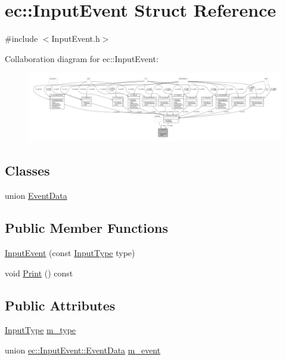 \hypertarget{structec_1_1_input_event}{}\section{ec\+:\+:Input\+Event Struct Reference}
\label{structec_1_1_input_event}


{\ttfamily \#include $<$Input\+Event.\+h$>$}



Collaboration diagram for ec\+:\+:Input\+Event\+:\nopagebreak
\begin{figure}[H]
\begin{center}
\leavevmode
\includegraphics[width=350pt]{structec_1_1_input_event__coll__graph}
\end{center}
\end{figure}
\subsection*{Classes}
\begin{DoxyCompactItemize}
\item 
union \mbox{\hyperlink{unionec_1_1_input_event_1_1_event_data}{Event\+Data}}
\end{DoxyCompactItemize}
\subsection*{Public Member Functions}
\begin{DoxyCompactItemize}
\item 
\mbox{\hyperlink{structec_1_1_input_event_ae7dd00fad1ba770de42ba5b7e977bc79}{Input\+Event}} (const \mbox{\hyperlink{namespaceec_a5de6bdb8c4b2ed6e590e721ec998f964}{Input\+Type}} type)
\item 
void \mbox{\hyperlink{structec_1_1_input_event_a1ecc94cf2e36938b8bfc1c413de6ba04}{Print}} () const
\end{DoxyCompactItemize}
\subsection*{Public Attributes}
\begin{DoxyCompactItemize}
\item 
\mbox{\hyperlink{namespaceec_a5de6bdb8c4b2ed6e590e721ec998f964}{Input\+Type}} \mbox{\hyperlink{structec_1_1_input_event_a07aadaf18da2952478b803bbd4122bb7}{m\+\_\+type}}
\item 
union \mbox{\hyperlink{unionec_1_1_input_event_1_1_event_data}{ec\+::\+Input\+Event\+::\+Event\+Data}} \mbox{\hyperlink{structec_1_1_input_event_a8d146eaa61615d0e9f680f68d920835c}{m\+\_\+event}}
\end{DoxyCompactItemize}



